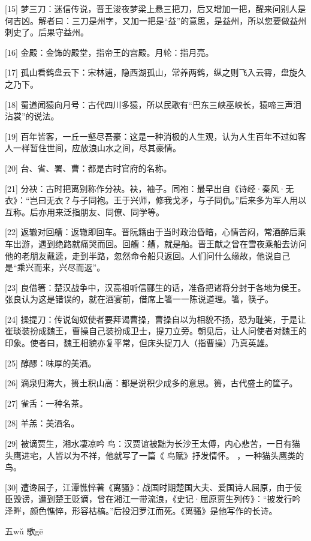 \documentclass[12pt,UTF8]{ctexbook}
\begin{document}
[15] 梦三刀：迷信传说，晋王浚夜梦梁上悬三把刀，后又增加一把，醒来问别人是何吉凶。解者曰：三刀是州字，又加一把是“益”的意思，是益州，所以您要做益州刺史了。后果守益州。

[16] 金殿：金饰的殿堂，指帝王的宫殿。月轮：指月亮。

[17] 孤山看鹤盘云下：宋林逋，隐西湖孤山，常养两鹤，纵之则飞入云霄，盘旋久之乃下。

[18] 蜀道闻猿向月号：古代四川多猿，所以民歌有“巴东三峡巫峡长，猿啼三声泪沾裳”的说法。

[19] 百年皆客，一丘一壑尽吾豪：这是一种消极的人生观，认为人生百年不过如客人一样暂住世间，应放浪山水之间，尽其豪情。

[20] 台、省、署、曹：都是古时官府的名称。

[21] 分袂：古时把离别称作分袂。袂，袖子。同袍：最早出自《诗经·秦风·无衣》：“岂曰无衣？与子同袍。王于兴师，修我戈矛，与子同仇。”后来多为军人用以互称。后亦用来泛指朋友、同僚、同学等。

[22] 返辙对回艚：返辙即回车。晋阮籍由于当时政治昏暗，心情苦闷，常酒醉后乘车出游，遇到绝路就痛哭而回。回艚：艚，就是船。晋王献之曾在雪夜乘船去访问他的老朋友戴逵，走到半路，忽然命令船只返回。人们问什么缘故，他说自己是“乘兴而来，兴尽而返”。

[23] 良借箸：楚汉战争中，汉高祖听信郦生的话，准备把诸将分封于各地为侯王。张良认为这是错误的，就在酒宴前，借席上箸一一陈说道理。箸，筷子。

[24] 操提刀：传说匈奴使者要拜谒曹操，曹操自以为相貌不扬，恐为耻笑，于是让崔琰装扮成魏王，曹操自己装扮成卫士，提刀立旁。朝见后，让人问使者对魏王的印象。使者曰，魏王相貌亦复平常，但床头捉刀人（指曹操）乃真英雄。

[25] 醇醪：味厚的美酒。

[26] 滴泉归海大，篑土积山高：都是说积少成多的意思。篑，古代盛土的筐子。

[27] 雀舌：一种名茶。

[28] 羊羔：美酒名。

[29] 被谪贾生，湘水凄凉吟 鸟：汉贾谊被黜为长沙王太傅，内心悲苦，一日有猫头鹰进宅，人皆以为不祥，他就写了一篇《 鸟赋》抒发情怀。 ，一种猫头鹰类的鸟。

[30] 遭谗屈子，江潭憔悴著《离骚》：战国时期楚国大夫、爱国诗人屈原，由于佞臣毁谤，遭到楚王贬谪，曾在湘江一带流浪，《史记·屈原贾生列传》：“披发行吟泽畔，颜色憔悴，形容枯槁。”后投汩罗江而死。《离骚》是他写作的长诗。





五wǔ 歌gē
\end{document}
